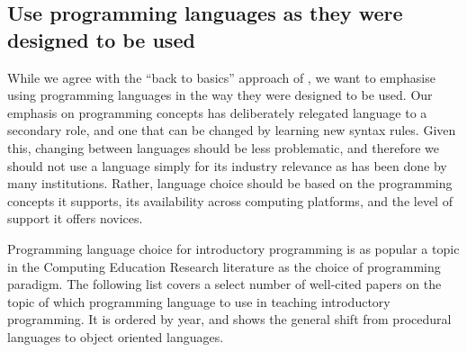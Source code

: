 
\subsection{Use programming languages as they were designed to be used} %
\label{ssub:use_programming_languages_as_they_were_designed_to_be_used}

While we agree with the ``back to basics'' approach of \citet{Reges:2006}, we want to emphasise using programming languages in the way they were designed to be used. Our emphasis on programming concepts has deliberately relegated language to a secondary role, and one that can be changed by learning new syntax rules. Given this, changing between languages should be less problematic, and therefore we should not use a language simply for its industry relevance as has been done by many institutions. Rather, language choice should be based on the programming concepts it supports, its availability across computing platforms, and the level of support it offers novices.

Programming language choice for introductory programming is as popular a topic in the Computing Education Research literature as the choice of programming paradigm. The following list covers a select number of well-cited papers on the topic of which programming language to use in teaching introductory programming. It is ordered by year, and shows the general shift from procedural languages to object oriented languages.

%
%



